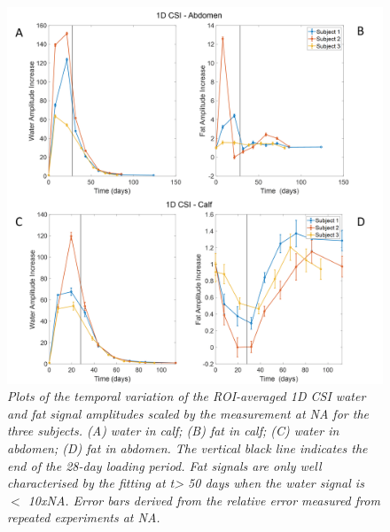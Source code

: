 \begin{figure}
    \centering
    \includegraphics[width=1\textwidth]{Figures/Lipid/1DCSI_Amplitude.png}
    \caption{\textit{Plots of the temporal variation of the \ac{ROI}-averaged 1D \ac{CSI} water and fat signal amplitudes scaled by the measurement at NA for the three subjects. (A) water in calf; (B) fat in calf; (C) water in abdomen; (D) fat in abdomen. The vertical black line indicates the end of the 28-day loading period. Fat signals are only well characterised by the fitting at t> 50 days when the water signal is $<$ 10x\ac{NA}.  Error bars derived from the relative error measured from repeated experiments at NA.}}
    \label{fig:Lip:1DCSI}
\end{figure}

